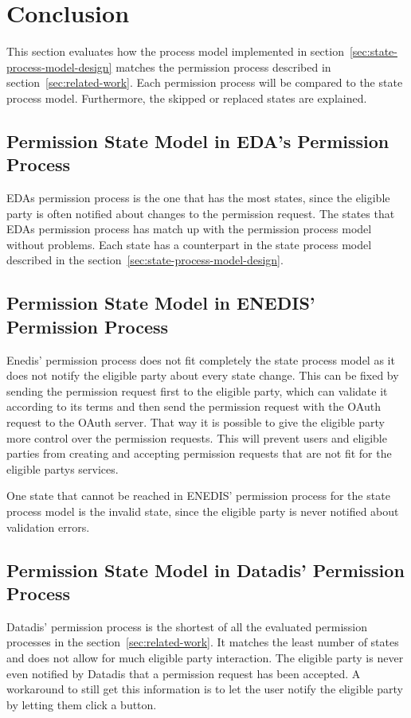 \section{Conclusion}\label{sec:conclusion}
This section evaluates how the process model implemented in section\ \ref{sec:state-process-model-design} matches the permission process described in section\ \ref{sec:related-work}.
Each permission process will be compared to the state process model.
Furthermore, the skipped or replaced states are explained.

\subsection{Permission State Model in EDA's Permission Process}\label{subsec:permission-state-model-in-eda's-permission-process}
EDAs permission process is the one that has the most states, since the eligible party is often notified about changes to the permission request.
The states that EDAs permission process has match up with the permission process model without problems.
Each state has a counterpart in the state process model described in the section\ \ref{sec:state-process-model-design}.

\subsection{Permission State Model in ENEDIS' Permission Process}\label{subsec:permission-state-model-in-enedis'-permission-process}
Enedis' permission process does not fit completely the state process model as it does not notify the eligible party about every state change.
This can be fixed by sending the permission request first to the eligible party, which can validate it according to its terms and then send the permission request with the OAuth request to the OAuth server.
That way it is possible to give the eligible party more control over the permission requests.
This will prevent users and eligible parties from creating and accepting permission requests that are not fit for the eligible partys services.

One state that cannot be reached in ENEDIS' permission process for the state process model is the invalid state, since the eligible party is never notified about validation errors.


\subsection{Permission State Model in Datadis' Permission Process}\label{subsec:permission-state-model-in-datadis'-permission-process}
Datadis' permission process is the shortest of all the evaluated permission processes in the section\ \ref{sec:related-work}.
It matches the least number of states and does not allow for much eligible party interaction.
The eligible party is never even notified by Datadis that a permission request has been accepted.
A workaround to still get this information is to let the user notify the eligible party by letting them click a button.

